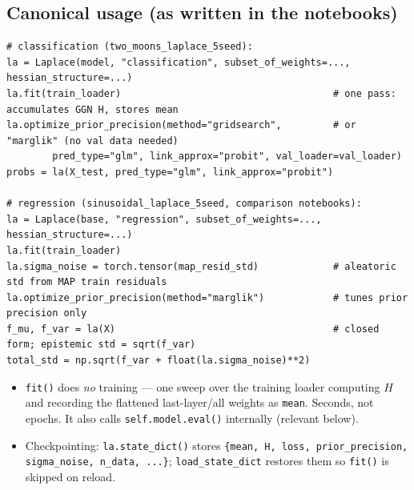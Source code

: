 \documentclass[10pt,a4paper]{article}
\newcommand{\code}[1]{\texttt{#1}}
\begin{document}
\subsection{Canonical usage (as written in the notebooks)}
\begin{lstlisting}
# classification (two_moons_laplace_5seed):
la = Laplace(model, "classification", subset_of_weights=..., hessian_structure=...)
la.fit(train_loader)                                     # one pass: accumulates GGN H, stores mean
la.optimize_prior_precision(method="gridsearch",         # or "marglik" (no val data needed)
        pred_type="glm", link_approx="probit", val_loader=val_loader)
probs = la(X_test, pred_type="glm", link_approx="probit")

# regression (sinusoidal_laplace_5seed, comparison notebooks):
la = Laplace(base, "regression", subset_of_weights=..., hessian_structure=...)
la.fit(train_loader)
la.sigma_noise = torch.tensor(map_resid_std)             # aleatoric std from MAP train residuals
la.optimize_prior_precision(method="marglik")            # tunes prior precision only
f_mu, f_var = la(X)                                      # closed form; epistemic std = sqrt(f_var)
total_std = np.sqrt(f_var + float(la.sigma_noise)**2)
\end{lstlisting}
\begin{itemize}
\item \code{fit()} does \emph{no} training --- one sweep over the training loader computing $H$
  and recording the flattened last-layer/all weights as \code{mean}. Seconds, not epochs. It also
  calls \code{self.model.eval()} internally (relevant below).
\item Checkpointing: \code{la.state\_dict()} stores \code{\{mean, H, loss, prior\_precision,
  sigma\_noise, n\_data, ...\}}; \code{load\_state\_dict} restores them so \code{fit()} is skipped
  on reload.
\end{itemize}
\end{document}
